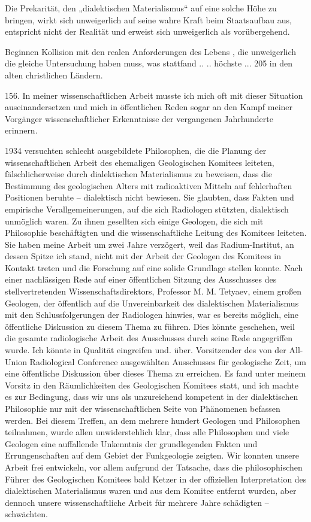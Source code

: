 \documentclass[11pt,a4paper]{book}
\begin{document}
Die Prekarität, den „dialektischen Materialismus“ auf eine solche Höhe zu bringen, wirkt sich unweigerlich auf seine wahre Kraft beim Staatsaufbau aus, entspricht nicht der Realität und erweist sich unweigerlich als vorübergehend.



Beginnen Kollision mit den realen Anforderungen des Lebens , die unweigerlich die gleiche Untersuchung haben muss, was stattfand .. .. höchste ... 205 in den alten christlichen Ländern.



156. In meiner wissenschaftlichen Arbeit musste ich mich oft mit dieser Situation auseinandersetzen und mich in öffentlichen Reden sogar an den Kampf meiner Vorgänger wissenschaftlicher Erkenntnisse der vergangenen Jahrhunderte erinnern.



1934 versuchten schlecht ausgebildete Philosophen, die die Planung der wissenschaftlichen Arbeit des ehemaligen Geologischen Komitees leiteten, fälschlicherweise durch dialektischen Materialismus zu beweisen, dass die Bestimmung des geologischen Alters mit radioaktiven Mitteln auf fehlerhaften Positionen beruhte -- dialektisch nicht bewiesen. Sie glaubten, dass Fakten und empirische Verallgemeinerungen, auf die sich Radiologen stützten, dialektisch unmöglich waren. Zu ihnen gesellten sich einige Geologen, die sich mit Philosophie beschäftigten und die wissenschaftliche Leitung des Komitees leiteten. Sie haben meine Arbeit um zwei Jahre verzögert, weil das Radium-Institut, an dessen Spitze ich stand, nicht mit der Arbeit der Geologen des Komitees in Kontakt treten und die Forschung auf eine solide Grundlage stellen konnte. Nach einer nachlässigen Rede auf einer öffentlichen Sitzung des Ausschusses des stellvertretenden Wissenschaftsdirektors, Professor M. M. Tetyaev, einem großen Geologen, der öffentlich auf die Unvereinbarkeit des dialektischen Materialismus mit den Schlussfolgerungen der Radiologen hinwies, war es bereits möglich, eine öffentliche Diskussion zu diesem Thema zu führen. Dies könnte geschehen, weil die gesamte radiologische Arbeit des Ausschusses durch seine Rede angegriffen wurde. Ich könnte in Qualität eingreifen und. über. Vorsitzender des von der All-Union Radiological Conference ausgewählten Ausschusses für geologische Zeit, um eine öffentliche Diskussion über dieses Thema zu erreichen. Es fand unter meinem Vorsitz in den Räumlichkeiten des Geologischen Komitees statt, und ich machte es zur Bedingung, dass wir uns als unzureichend kompetent in der dialektischen Philosophie nur mit der wissenschaftlichen Seite von Phänomenen befassen werden. Bei diesem Treffen, an dem mehrere hundert Geologen und Philosophen teilnahmen, wurde allen unwiderstehlich klar, dass alle Philosophen und viele Geologen eine auffallende Unkenntnis der grundlegenden Fakten und Errungenschaften auf dem Gebiet der Funkgeologie zeigten. Wir konnten unsere Arbeit frei entwickeln, vor allem aufgrund der Tatsache, dass die philosophischen Führer des Geologischen Komitees bald Ketzer in der offiziellen Interpretation des dialektischen Materialismus waren und aus dem Komitee entfernt wurden, aber dennoch unsere wissenschaftliche Arbeit für mehrere Jahre schädigten -- schwächten.
\end{document}
